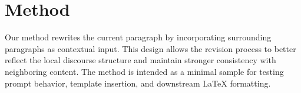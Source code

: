 \section{Method}

Our method rewrites the current paragraph by incorporating surrounding paragraphs as contextual input. This design allows the revision process to better reflect the local discourse structure and maintain stronger consistency with neighboring content. The method is intended as a minimal sample for testing prompt behavior, template insertion, and downstream LaTeX formatting.
